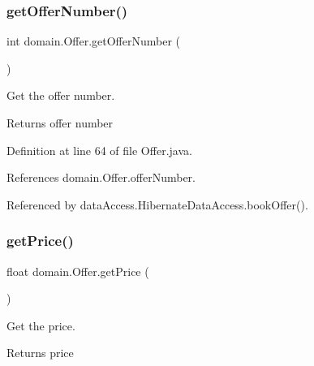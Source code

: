 \mbox{\label{classdomain_1_1Offer_ab9e27c474ec6819a27eac1847d876c3a}} 
\subsubsection{\texorpdfstring{getOfferNumber()}{getOfferNumber()}}
{\footnotesize\ttfamily int domain.\+Offer.\+get\+Offer\+Number (\begin{DoxyParamCaption}{ }\end{DoxyParamCaption})}



Get the offer number. 

\begin{DoxyReturn}{Returns}
offer number 
\end{DoxyReturn}


Definition at line 64 of file Offer.\+java.


\begin{DoxyCode}{0}

\end{DoxyCode}


References domain.\+Offer.\+offer\+Number.



Referenced by data\+Access.\+Hibernate\+Data\+Access.\+book\+Offer().

\mbox{\label{classdomain_1_1Offer_a4ebf9c6f415709b527e006fdffa3a0c3}} 
\subsubsection{\texorpdfstring{getPrice()}{getPrice()}}
{\footnotesize\ttfamily float domain.\+Offer.\+get\+Price (\begin{DoxyParamCaption}{ }\end{DoxyParamCaption})}



Get the price. 

\begin{DoxyReturn}{Returns}
price 
\end{DoxyReturn}


